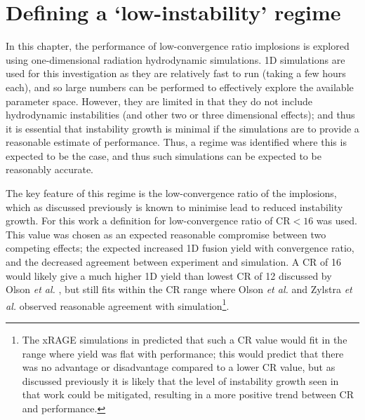 

\section{Defining a `low-instability' regime} \label{sec: Low-Instability}

In this chapter, the performance of low-convergence ratio implosions is explored using one-dimensional radiation hydrodynamic simulations. 1D simulations are used for this investigation as they are relatively fast to run (taking a few hours each), and so large numbers can be performed to effectively explore the available parameter space. However, they are limited in that they do not include hydrodynamic instabilities (and other two or three dimensional effects); and thus it is essential that instability growth is minimal if the simulations are to provide a reasonable estimate of performance. Thus, a regime was identified where this is expected to be the case, and thus such simulations can be expected to be reasonably accurate.

The key feature of this regime is the low-convergence ratio of the implosions, which as discussed previously is known to minimise lead to reduced instability growth. For this work a definition for low-convergence ratio of CR$<16$ was used. This value was chosen as an expected reasonable compromise between two competing effects; the expected increased 1D fusion yield with convergence ratio, and the decreased agreement between experiment and simulation. A CR of 16 would likely give a much higher 1D yield than lowest CR of 12 discussed by Olson \textit{et al.} \cite{Olson2016}, but still fits within the CR range where Olson \textit{et al.} \cite{Olson2016} and Zylstra \textit{et al.} \cite{Zylstra2018} observed reasonable agreement with simulation\footnote{ The xRAGE simulations in \cite{Haines2017a} predicted that such a CR value would fit in the range where yield was flat with performance; this would predict that there was no advantage or disadvantage compared to a lower CR value, but as discussed previously it is likely that the level of instability growth seen in that work could be mitigated, resulting in a more positive trend between CR and performance.}. 

